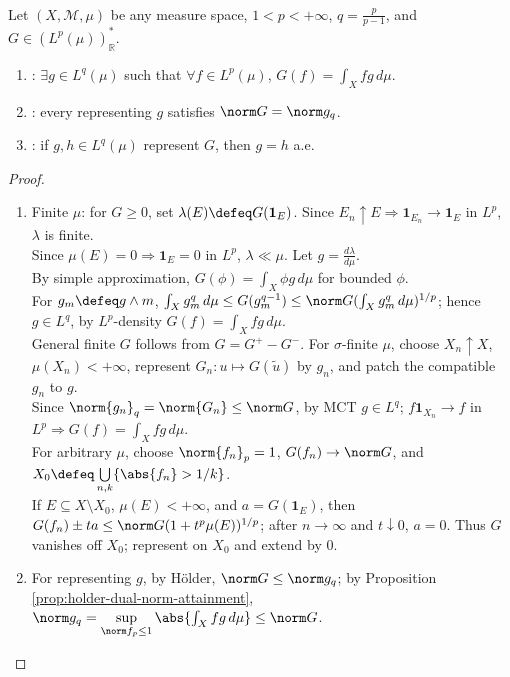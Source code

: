 \begin{theorem} \label{thm:riesz-representation-lp} \\
Let $(X,\mathcal M,\mu)$ be any measure space, $1<p<+\infty$, $q=\frac{p}{p-1}$, and $G\in(L^p(\mu))^*_\mathbb R$.
\begin{enumerate}[label=(\roman*)]
\setlength{\itemsep}{0pt}
\item {}: $\exists g\in L^q(\mu)$ such that $\forall f\in L^p(\mu)$, $G(f)=\int_Xfg\,d\mu$.
\item {}: every representing $g$ satisfies $\norm G=\norm g_q$.
\item {}: if $g,h\in L^q(\mu)$ represent $G$, then $g=h$ a.e.
\end{enumerate}
\begin{proof}
\begin{enumerate}[label=(\roman*)]
\setlength{\itemsep}{0pt}
\item Finite $\mu$: for $G\geq0$, set $\lambda(E)\defeq G(\mathbf 1_E)$. Since $E_n\uparrow E\Rightarrow\mathbf 1_{E_n}\to\mathbf 1_E$ in $L^p$, $\lambda$ is finite.\\
Since $\mu(E)=0\Rightarrow\mathbf 1_E=0$ in $L^p$, $\lambda\ll\mu$. Let $g=\frac{d\lambda}{d\mu}$.\\
By simple approximation, $G(\phi)=\int_X\phi g\,d\mu$ for bounded $\phi$.\\
For $g_m\defeq g\wedge m$, $\int_Xg_m^q\,d\mu\leq G(g_m^{q-1})\leq\norm G(\int_Xg_m^q\,d\mu)^{1/p}$; hence $g\in L^q$, by $L^p$-density $G(f)=\int_Xfg\,d\mu$.\\
General finite $G$ follows from $G=G^+-G^-$. For $\sigma$-finite $\mu$, choose $X_n\uparrow X$, $\mu(X_n)<+\infty$, represent $G_n:u\mapsto G(\tilde u)$ by $g_n$, and patch the compatible $g_n$ to $g$.\\
Since $\norm{g_n}_q=\norm{G_n}\leq\norm G$, by MCT $g\in L^q$; $f\mathbf 1_{X_n}\to f$ in $L^p\Rightarrow G(f)=\int_Xfg\,d\mu$.\\
For arbitrary $\mu$, choose $\norm{f_n}_p=1$, $G(f_n)\to\norm G$, and $X_0\defeq\bigcup\limits_{n,k}\{\abs{f_n}>1/k\}$.\\
If $E\subseteq X\setminus X_0$, $\mu(E)<+\infty$, and $a=G(\mathbf 1_E)$, then $G(f_n)\pm ta\leq\norm G(1+t^p\mu(E))^{1/p}$; after $n\to\infty$ and $t\downarrow0$, $a=0$. Thus $G$ vanishes off $X_0$; represent on $X_0$ and extend by $0$.
\item For representing $g$, by H\"older, $\norm G\leq\norm g_q$; by Proposition \ref{prop:holder-dual-norm-attainment}, $\norm g_q=\sup\limits_{\norm f_p\leq1}\abs{\int_Xfg\,d\mu}\leq\norm G$.

\end{enumerate}
\end{proof}
\end{theorem}
